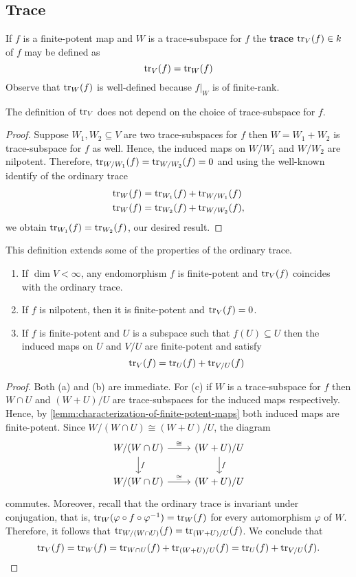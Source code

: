 \subsection*{Trace}  If $f$ is a finite-potent map and $W$ is a trace-subspace for $f$ the \textbf{trace} $\operatorname{tr}_{V}(f)\in k$ of $f$ may be defined as
\[
	\operatorname{tr}_{V}(f) = \operatorname{tr}_{W}(f)
\]
Observe that $\operatorname{tr}_{W}(f)$ is well-defined because $f\lvert_{W}$ is of finite-rank. 
\begin{proposition}\label{prop:trace-does-not-depend-on-W}
	The definition of $\operatorname{tr}_{V}$ does not depend on the choice of trace-subspace for $f$.
\end{proposition}
\begin{proof}
	Suppose $W_{1}, W_{2} \subseteq V$ are two trace-subspaces for $f$ then $W = W_{1} + W_{2}$ is trace-subspace for $f$ as well. Hence, the induced maps on $W/W_{1}$ and $W/W_{2}$ are nilpotent. Therefore, $\operatorname{tr}_{W/W_{1}}(f) = \operatorname{tr}_{W/W_{2}}(f) = 0$ and using the well-known identify of the ordinary trace
\begin{align*}
	\operatorname{tr}_{W}(f) &= \operatorname{tr}_{W_{1}}(f) + \operatorname{tr}_{W/W_{1}}(f) \\
	\operatorname{tr}_{W}(f) &= \operatorname{tr}_{W_{2}}(f) + \operatorname{tr}_{W/W_{2}}(f),
\end{align*}
we obtain $\operatorname{tr}_{W_{1}}(f) = \operatorname{tr}_{W_{2}}(f)$, our desired result. 
\end{proof}
This definition extends some of the properties of the ordinary trace.
\begin{lemma}\label{lemm:properties-trace}
	\begin{enumerate}[label = (\alph*)]
		\item If $\dim V < \infty$, any endomorphism $f$ is finite-potent and $\operatorname{tr}_{V}(f)$ coincides with the ordinary trace.
		\item If $f$ is nilpotent, then it is finite-potent and $\operatorname{tr}_{V}(f) = 0$.
		\item If $f$ is finite-potent and $U$ is a subspace such that $f(U) \subseteq U$ then the induced maps on $U$ and $V/U$ are finite-potent and satisfy
		\[
		 	\operatorname{tr}_{V}(f) = \operatorname{tr}_{U}(f) + \operatorname{tr}_{V/U}(f)
		 \] 
	\end{enumerate}
\end{lemma}
\begin{proof}
	Both (a) and (b) are immediate. For (c) if $W$ is a trace-subspace for $f$ then $W\cap U$ and $(W + U)/U$ are trace-subspaces for the induced maps respectively. Hence, by \cref{lemm:characterization-of-finite-potent-maps} both induced maps are finite-potent. Since $W/(W\cap U) \cong (W+U)/U$, the diagram
	\[
		\begin{tikzcd}
			W/(W\cap U) \arrow[r, "\cong"] \arrow[d, "f"] & (W+U)/U \arrow[d, "f"] \\
			W/(W\cap U) \arrow[r, "\cong"] & (W+U)/U
		\end{tikzcd}
	\]
	commutes. Moreover, recall that the ordinary trace is invariant under conjugation, that is, $\operatorname{tr}_{W}(\varphi \circ f \circ \varphi^{-1}) = \operatorname{tr}_{W}(f)$ for every automorphism $\varphi$ of $W$. Therefore, it follows that $\operatorname{tr}_{W/(W\cap U)}(f) = \operatorname{tr}_{(W+U)/U}(f)$. We conclude that
	\[
	 	\operatorname{tr}_{V}(f) = \operatorname{tr}_{W}(f) = \operatorname{tr}_{W\cap U}(f) + \operatorname{tr}_{(W+U)/U}(f) = \operatorname{tr}_{U}(f) + \operatorname{tr}_{V/U}(f).
	\]
\end{proof}
